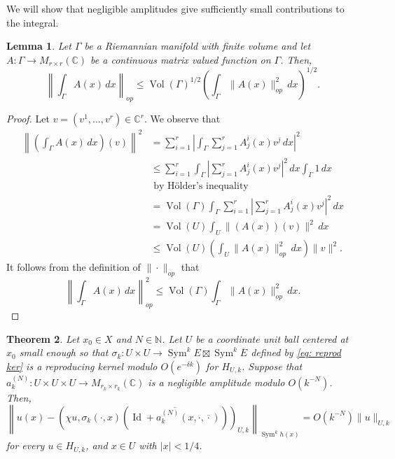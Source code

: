 \documentclass{amsart}
\newtheorem{thm}{Theorem}[section]
\newtheorem{lem}[thm]{Lemma}
\theoremstyle{definition}
\theoremstyle{remark}
\numberwithin{equation}{section}
\DeclareMathOperator{\Sym}{Sym}
\DeclareMathOperator{\Id}{Id}
\DeclareMathOperator{\Vol}{Vol}
\begin{document}
We will show that negligible amplitudes give sufficiently small contributions to the integral. 


\begin{lem} \label{lem: Operator}
Let $\Gamma$ be a Riemannian manifold with finite volume and let $A: \Gamma \to M_{r\times r}(\mathbb{C})$ be a continuous matrix valued function on $\Gamma$. Then,
\begin{equation*}
\left \| \int_\Gamma A(x) \,dx \right \|_{op} \leq \Vol(\Gamma)^{1/2} \left ( \int_\Gamma \| A(x)\|_{op}^2 \,dx \right)^{1/2}.
\end{equation*}
\end{lem}

\begin{proof}
Let $v = (v^1, \dotsc, v^r) \in \mathbb{C}^r$. We observe that
\begin{align*}
\left \| \left ( \int_\Gamma A(x) \,dx\right ) (v) \right \|^2 & = \sum_{i=1}^r \left | \int_\Gamma \sum_{j=1}^r A_j^i(x)v^j \,dx \right |^2 \\
    & \leq \sum_{i=1}^r \int_\Gamma \left | \sum_{j=1}^r A_j^i(x)v^j \right |^2 \,dx \int_\Gamma 1 \,dx \\
    & \text{ by H\"older's inequality} \\
    & = \Vol(\Gamma) \int_\Gamma \sum_{i=1}^r \left | \sum_{j=1}^r A_j^i(x)v^j \right |^2 \,dx \\
    & = \Vol(U) \int_U \|(A(x))(v)\|^2 \,dx \\
    & \leq \Vol(U) \left ( \int_U \|A(x)\|_{op}^2 \,dx \right ) \|v\|^2.
\end{align*}
It follows from the definition of $\|\cdot\|_{op}$ that
\begin{equation*}
\left \| \int_\Gamma A(x) \,dx \right \|_{op}^2 \leq \Vol(\Gamma) \int_\Gamma \| A(x)\|_{op}^2 \,dx.
\end{equation*}
\end{proof}




\begin{thm} \label{thm: local reprod mod}
Let $x_0 \in X$ and $N \in \mathbb{N}$. Let $U$ be a coordinate unit ball centered at $x_0$ small enough so that $\sigma_k : U \times U \to \Sym^kE \boxtimes \Sym^k \overline{E}$ defined by \eqref{eq: reprod ker} is a reproducing kernel modulo $O(e^{-\delta k})$ for $H_{U,k}$. Suppose that $a_k^{(N)}: U \times U \times U \to M_{r_k \times r_k}(\mathbb{C})$ is a negligible amplitude modulo $O(k^{-N})$. Then,
$$
\left \|u(x) - \left (\chi u, \sigma_{k}(\cdot, x) \left ( \overline{\Id + a_k^{(N)}(x,\cdot,\overline{\cdot})} \right ) \right )_{U,k} \right  \|_{\Sym^k h(x)} = O(k^{-N})   \|u\|_{U,k}
$$
for every $u \in H_{U,k}$, and $x \in U$ with $|x| < 1/4$.
\end{thm}
\end{document}
